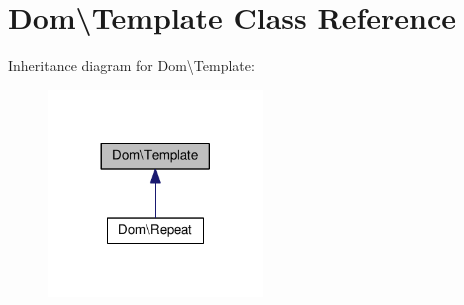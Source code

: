 \hypertarget{classDom_1_1Template}{\section{Dom\textbackslash{}Template Class Reference}
\label{classDom_1_1Template}
}


Inheritance diagram for Dom\textbackslash{}Template\+:\nopagebreak
\begin{figure}[H]
\begin{center}
\leavevmode
\includegraphics[width=161pt]{classDom_1_1Template__inherit__graph}
\end{center}
\end{figure}
